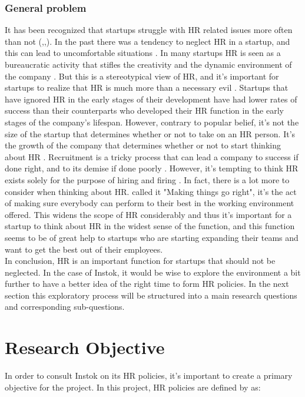 \documentclass[man]{apa6}
\begin{document}
\subsubsection{General problem} It has been recognized that startups struggle with HR related issues more often than not (\parencite{FUNG2012},\parencite{WEISSMAN2016},\parencite{BUCH2016}). In the past there was a tendency to neglect HR in a startup, and this can lead to uncomfortable situations \parencite{WEISSMAN2016}. In many startups HR is seen as a bureaucratic activity that stifles the creativity and the dynamic environment of the company \parencite{FUNG2012}. But this is a stereotypical view of HR, and it's important for startups to realize that HR is much more than a necessary evil \parencite{WEISSMAN2016}. Startups that have ignored HR in the early stages of their development have had lower rates of success than their counterparts who developed their HR function in the early stages of the company's lifespan. However, contrary to popular belief, it's not the size of the startup that determines whether or not to take on an HR person. It's the growth of the company that determines whether or not to start thinking about HR \parencite{COY2015}. Recruitment is a tricky process that can lead a company to success if done right, and to its demise if done poorly \parencite{MUMBAI2014}. However, it's tempting to think HR exists solely for the purpose of hiring and firing \parencite{COY2015}. In fact, there is a lot more to consider when thinking about HR. \cite{COY2015} called it "Making things go right", it's the act of making sure everybody can perform to their best in the working environment offered. This widens the scope of HR considerably and thus it's important for a startup to think about HR in the widest sense of the function, and this function seems to be of great help to startups who are starting expanding their teams and want to get the best out of their employees.\\
In conclusion, HR is an important function for startups that should not be neglected. In the case of Instok, it would be wise to explore the environment a bit further to have a better idea of the right time to form HR policies. In the next section this exploratory process will be structured into a main research questions and corresponding sub-questions. 

\section{Research Objective}
In order to consult Instok on its HR policies, it's important to create a primary objective for the project. In this project, HR policies are defined by \cite{HRCA2016} as: 
\end{document}
